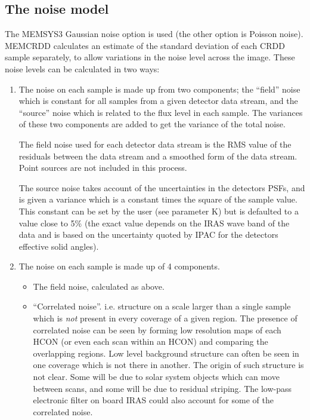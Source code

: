 \subsection {The noise model}
\label {SEC:NOISE}
The MEMSYS3 Gaussian noise option is used (the other option is Poisson noise).
MEMCRDD calculates an estimate of the standard deviation of each CRDD sample
separately, to allow variations in the noise level across the image. These
noise levels can be calculated in two ways:
\begin{enumerate}

\item The noise on each sample is made up from two components; the ``field''
noise which is constant for all samples from a given detector data stream, and
the ``source'' noise which is related to the flux level in each sample. The
variances of these two components are added to get the variance of the total
noise.

The field noise used for each detector data stream is the RMS value of
the residuals between the data stream and a smoothed form of the data stream.
Point sources are not included in this process.

The source noise takes account of the uncertainties in the detectors PSFs, and
is given a variance which is a constant times the square of the sample value.
This constant can be set by the user (see parameter K) but is defaulted to a
value close to 5\% (the exact value depends on the IRAS wave band of the data
and is based on the uncertainty quoted by IPAC for the detectors effective solid
angles).

\item The noise on each sample is made up of 4 components.
\begin {itemize}
\item The field noise, calculated as above.
\item ``Correlated noise''. i.e. structure on a scale larger than a single
sample which is {\em not} present in every coverage of a given region. The
presence of correlated noise can be seen by forming low resolution maps of each
HCON (or even each scan within an HCON) and comparing the overlapping regions.
Low level background structure can often be seen in one coverage which is not
there in another. The origin of such structure is not clear. Some will be due to
solar system objects which can move between scans, and some will be due to
residual striping. The low-pass electronic filter on board IRAS could also
account for some of the correlated noise.


\end{itemize}
\end{enumerate}
